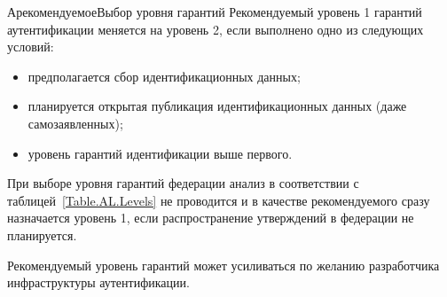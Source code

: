 \begin{appendix}{А}{рекомендуемое}{Выбор уровня гарантий}
Рекомендуемый уровень 1 гарантий аутентификации меняется на уровень 2,
если выполнено одно из следующих условий:
\begin{itemize}
\item
предполагается сбор идентификационных данных;
\item
планируется открытая публикация идентификационных данных (даже самозаявленных);
\item
уровень гарантий идентификации выше первого.
\end{itemize}

При выборе уровня гарантий федерации анализ в соответствии с 
таблицей~\ref{Table.AL.Levels} не проводится и в качестве рекомендуемого 
сразу назначается уровень 1, если распространение утверждений в федерации не 
планируется.

Рекомендуемый уровень гарантий может усиливаться по желанию 
разработчика инфраструктуры аутентификации.

\end{appendix}
